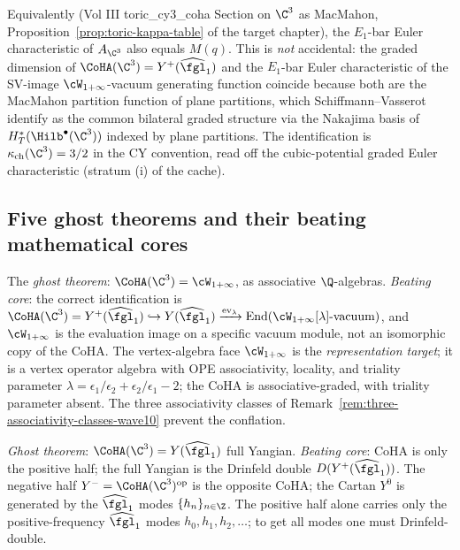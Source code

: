 \begin{remark}
\label{rem:macmahon-bar-euler-wave10}
Equivalently (Vol III toric\_cy3\_coha Section on $\C^3$ as MacMahon,
Proposition~\ref{prop:toric-kappa-table} of the target chapter), the
$E_1$-bar Euler characteristic of $A_{\C^3}$ also equals $M(q)$. This
is \emph{not} accidental: the graded dimension of $\CoHA(\C^3) =
Y^+(\widehat{\fgl}_1)$ and the $E_1$-bar Euler characteristic of the
SV-image $\cW_{1+\infty}$-vacuum generating function coincide because
both are the MacMahon partition function of plane partitions, which
Schiffmann--Vasserot identify as the common bilateral graded structure
via the Nakajima basis of $H^*_T(\Hilb^\bullet(\C^3))$ indexed by
plane partitions.  The identification is $\kappa_{\mathrm{ch}}(\C^3) =
3/2$ in the CY convention, read off the cubic-potential graded Euler
characteristic (stratum (i) of the cache).
\end{remark}

\subsection*{Five ghost theorems and their beating mathematical cores}

\begin{remark}[Ghost theorem 1: $\CoHA(\C^3) = \cW_{1+\infty}$]
\label{rem:ghost-theorem-1-wave10}
The \emph{ghost theorem}: $\CoHA(\C^3) = \cW_{1+\infty}$, as associative
$\Q$-algebras. \emph{Beating core}: the correct identification is
$\CoHA(\C^3) = Y^+(\widehat{\fgl}_1) \hookrightarrow Y(\widehat{\fgl}_1)
\xrightarrow{\mathrm{ev}_\lambda} \mathrm{End}(\cW_{1+\infty}[\lambda]
\text{-vacuum})$, and $\cW_{1+\infty}$ is the evaluation image on a
specific vacuum module, not an isomorphic copy of the CoHA. The
vertex-algebra face $\cW_{1+\infty}$ is the \emph{representation
target}; it is a vertex operator algebra with OPE associativity,
locality, and triality parameter $\lambda = \epsilon_1 / \epsilon_2 +
\epsilon_2 / \epsilon_1 - 2$; the CoHA is associative-graded, with
triality parameter absent. The three associativity classes of
Remark~\ref{rem:three-associativity-classes-wave10} prevent the
conflation.
\end{remark}

\begin{remark}[Ghost theorem 2: $\CoHA(\C^3) = Y(\widehat{\fgl}_1)$]
\label{rem:ghost-theorem-2-wave10}
\emph{Ghost theorem}: $\CoHA(\C^3) = Y(\widehat{\fgl}_1)$ full Yangian.
\emph{Beating core}: CoHA is only the positive half; the full Yangian
is the Drinfeld double $D(Y^+(\widehat{\fgl}_1))$. The negative half
$Y^- = \CoHA(\C^3)^{\mathrm{op}}$ is the opposite CoHA; the Cartan
$Y^0$ is generated by the $\widehat{\fgl}_1$ modes $\{h_n\}_{n \in \Z}$.
The positive half alone carries only the positive-frequency
$\widehat{\fgl}_1$ modes $h_0, h_1, h_2, \ldots$; to get all modes one
must Drinfeld-double.
\end{remark}

